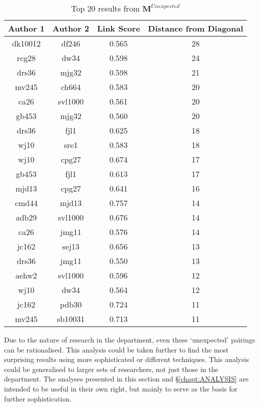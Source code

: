 \begin{table}[H]
\centering
\caption{Top 20 results from $\mathbf{M}^{Unexpected}$}
\label{tab:unexp}
\begin{tabular}{||c|c|c|c||}
\hline
Author 1 & Author 2 & Link Score & Distance from Diagonal\\
\hline
dk10012 & df246 & 0.565 & 28 \\ 
rcg28 & dw34 & 0.598 & 24 \\ 
drs36 & mjg32 & 0.598 & 21 \\ 
mv245 & ch664 & 0.583 & 20 \\
ca26 & svl1000 & 0.561 & 20 \\ 
gb453 & mjg32 & 0.560 & 20 \\ 
drs36 & fjl1 & 0.625 & 18 \\ 
wj10 & sre1 & 0.583 & 18 \\ 
wj10 & cpg27 & 0.674 & 17 \\ 
gb453 & fjl1 & 0.613 & 17 \\ 
mjd13 & cpg27 & 0.641 & 16 \\ 
cmd44 & mjd13 & 0.757 & 14 \\
adb29 & svl1000 & 0.676 & 14 \\ 
ca26 & jmg11 & 0.576 & 14 \\ 
jc162 & sej13 & 0.656 & 13 \\ 
drs36 & jmg11 & 0.550 & 13 \\
aehw2 & svl1000 & 0.596 & 12 \\ 
wj10 & dw34 & 0.564 & 12 \\ 
jc162 & pdb30 & 0.724 & 11 \\ 
mv245 & sb10031 & 0.713 & 11 \\ 
\hline
\end{tabular}
\end{table}
Due to the nature of research in the department, even these `unexpected' pairings can be rationalised. This analysis could be taken further to find the most surprising results using more sophisticated or different techniques. This analysis could be generalised to larger sets of researchers, not just those in the department. The analyses presented in this section and \S\ref{chapt:ANALYSIS} are intended to be useful in their own right, but mainly to serve as the basis for further sophistication.